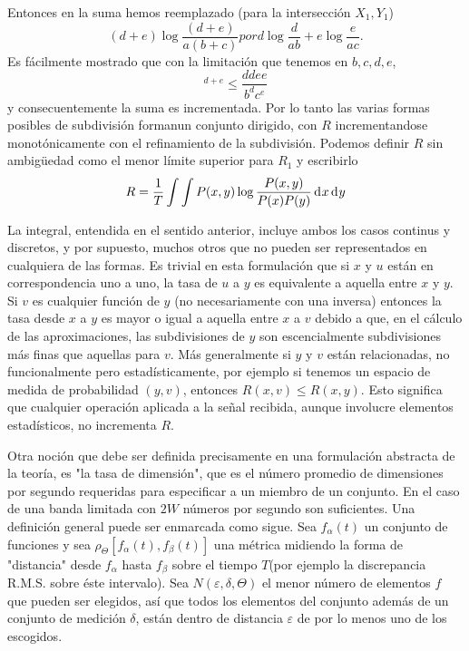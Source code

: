 \begin{appendices}
Entonces en la suma hemos reemplazado (para la intersecci\'on $X_{1}, Y_{1}$)
\begin{equation} (d + e) \log 
\frac{(d + e)}{a(b + c)}  por d \log \frac{d}{ab} 
+ e \log \frac{e}{ac}. \end{equation}
Es f\'acilmente mostrado que con la limitaci\'on que tenemos en $b, c,
d, e$,
\begin{equation} 
[\frac{d + e}{b + c}]^{d+e} \leq \frac{d{d} e{e}}{b^{d} c^{e}} \end{equation}
y consecuentemente la suma es incrementada. Por lo tanto las varias formas posibles
de subdivisi\'on formanun conjunto dirigido, con $R$ incrementandose monot\'onicamente
con el refinamiento de la subdivisi\'on. Podemos definir $R$ sin ambigüedad como el
menor l\'imite superior para $R_{1}$ y escribirlo
\begin{equation} R = \frac{1}{T} \int \int P(x,y) \log 
\frac{P(x,y)}{P(x) P(y)} \diff x  \diff y \end{equation}
			
La integral, entendida en el sentido anterior, incluye ambos los casos
continus y discretos, y por supuesto, muchos otros que no pueden ser
representados en cualquiera de las formas. Es trivial en esta
formulaci\'on que si $x$ y $u$ est\'an en correspondencia uno a uno,
la tasa de $u$ a $y$ es equivalente a aquella entre $x$ y $y$. Si $v$
es cualquier funci\'on de $y$ (no necesariamente con una inversa)
entonces la tasa desde $x$ a $y$ es mayor o igual a aquella entre $x$
a $v$ debido a que, en el c\'alculo de las aproximaciones, las
subdivisiones de $y$ son escencialmente subdivisiones m\'as finas que
aquellas para $v$. M\'as generalmente si $y$ y $v$ est\'an
relacionadas, no funcionalmente pero estad\'isticamente, por ejemplo
si tenemos un espacio de medida de probabilidad $(y, v)$, entonces
$R(x,v) \leq R(x,y)$. Esto significa que cualquier operaci\'on
aplicada a la señal recibida, aunque involucre elementos
estad\'isticos, no incrementa $R$.

Otra noci\'on que debe ser definida precisamente en una formulaci\'on
abstracta de la teor\'ia, es "la tasa de dimensi\'on", que es el
n\'umero promedio de dimensiones por segundo requeridas para
especificar a un miembro de un conjunto. En el caso de una banda
limitada con $2W$ n\'umeros por segundo son suficientes. Una
definici\'on general puede ser enmarcada como sigue. Sea
$f_{\alpha}(t)$ un conjunto de funciones y sea $\rho_{\Theta} \left
[f_{\alpha}(t),f_{\beta}(t) \right ]$ una m\'etrica midiendo la forma
de "distancia" desde $f_{\alpha}$ hasta $f_{\beta}$ sobre el tiempo
$T$(por ejemplo la discrepancia R.M.S. sobre \'este intervalo). Sea
$N(\varepsilon, \delta, \Theta)$ el menor n\'umero de elementos $f$
que pueden ser elegidos, as\'i que todos los elementos del conjunto
adem\'as de un conjunto de medici\'on $\delta$, est\'an dentro de
distancia $\varepsilon$ de por lo menos uno de los escogidos.


\end{appendices}
